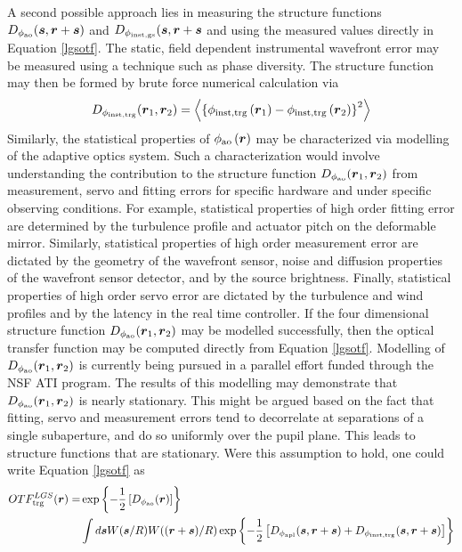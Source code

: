 A second possible approach lies in measuring the structure functions
$D_{\rm \phi_{ao}}(\boldsymbol{s},\boldsymbol{r} + \boldsymbol{s})$
and $D_{\rm \phi_{inst,gs}}(\boldsymbol{s},\boldsymbol{r} +
\boldsymbol{s}$ and using the measured values directly in Equation
\ref{lgsotf}.  The static, field dependent instrumental wavefront
error may be measured using a technique such as phase diversity.  The
structure function may then be formed by brute force numerical
calculation via
\begin{equation}
\label{strfn_inst}
D_{\rm \phi_{inst,trg}}(\boldsymbol{r}_{1},\boldsymbol{r}_{2})  = 
\left\langle \left\{\phi_{\rm inst,trg}\left(\boldsymbol{r}_{1}\right) - 
\phi_{\rm inst,trg}\left(\boldsymbol{r}_{2}\right)\right\}^{2}\right\rangle
\end{equation}
Similarly, the statistical properties of $\phi_{\rm
  ao}\left(\boldsymbol{r}\right)$ may be characterized via modelling
of the adaptive optics system.  Such a characterization would involve
understanding the contribution to the structure function $D_{\rm
  \phi_{ao}}(\boldsymbol{r}_{1},\boldsymbol{r}_{2})$ from measurement,
servo and fitting errors for specific hardware and under specific
observing conditions.  For example, statistical properties of high
order fitting error are determined by the turbulence profile and
actuator pitch on the deformable mirror.  Similarly, statistical
properties of high order measurement error are dictated by the
geometry of the wavefront sensor, noise and diffusion properties of
the wavefront sensor detector, and by the source brightness.  Finally,
statistical properties of high order servo error are dictated by the
turbulence and wind profiles and by the latency in the real time
controller.  If the four dimensional structure function $D_{\rm
  \phi_{ao}}(\boldsymbol{r}_{1},\boldsymbol{r}_{2})$ may be modelled
successfully, then the optical transfer function may be computed
directly from Equation \ref{lgsotf}.  Modelling of $D_{\rm
  \phi_{ao}}(\boldsymbol{r}_{1},\boldsymbol{r}_{2})$ is currently
being pursued in a parallel effort funded through the NSF ATI program.
The results of this modelling may demonstrate that $D_{\rm
  \phi_{ao}}(\boldsymbol{r}_{1},\boldsymbol{r}_{2})$ is nearly
stationary.  This might be argued based on the fact that fitting,
servo and measurement errors tend to decorrelate at separations of a
single subaperture, and do so uniformly over the pupil plane.  This
leads to structure functions that are stationary.  Were this
assumption to hold, one could write Equation \ref{lgsotf} as
\begin{equation}\label{lgsotfb}
\begin{aligned}
OTF^{LGS}_{\rm trg}(\boldsymbol{r}) = 
& \exp{\left\{-{1 \over 2}\left[D_{\rm \phi_{\rm ao}}(\boldsymbol{r})\right]\right\}}  \\
& \int d\boldsymbol{s} W(\boldsymbol{s}/R)W((\boldsymbol{r}+\boldsymbol{s})/R) 
\exp{\left\{-{1 \over 2}\left[
D_{\rm \phi_{apl}}(\boldsymbol{s},\boldsymbol{r} + \boldsymbol{s}) +
D_{\rm \phi_{inst,trg}}(\boldsymbol{s},\boldsymbol{r} + \boldsymbol{s})
\right]\right\}}
\end{aligned}
\end{equation}
